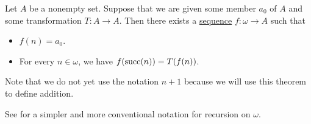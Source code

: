 \begin{theorem}\label{thm:omega_recursion}
  Let \( A \) be a nonempty set. Suppose that we are given some member \( a_0 \) of \( A \) and some transformation \( T: A \to A \). Then there exists a \hyperref[def:sequence]{sequence} \( f: \omega \to A \) such that
  \begin{itemize}
    \item \( f(n) = a_0 \).
    \item For every \( n \in \omega \), we have \( f(\operatorname{succ}(n)) = T(f(n)) \).
  \end{itemize}
\end{theorem}
\begin{comments}
  \item Note that we do not yet use the notation \( n + 1 \) because we will use this theorem to define addition.
  \item See  for a simpler and more conventional notation for recursion on \( \omega \).
\end{comments}
